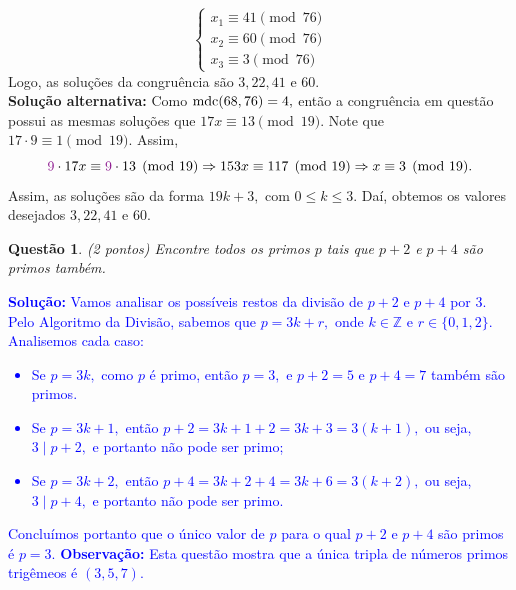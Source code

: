 \documentclass[oneside,a4paper,12pt]{article}
\newcommand{\mdc}{{\rm mdc}}
\theoremstyle{Colorido}
\theoremstyle{solu}
\theoremstyle{dotlessP}
\newcommand{\solucao}[1]{\textcolor{blue}{\textbf{Solução:} #1}}
\newtheorem{sol}{Questão}
\begin{document}
{\[\begin{cases}
x_1 \equiv41 \pmod{76}\\
x_2 \equiv 60 \pmod{76}\\
x_3 \equiv 3 \pmod{76}
\end{cases}
\]
Logo, as soluções da congruência são $3, 22, 41$ e $60.$\\\textbf{Solução alternativa:} Como $\mdc(68,76) = 4,$ então a congruência em questão possui as mesmas soluções que $17x \equiv 13 \pmod{19}.$ Note que $17 \cdot 9 \equiv 1 \pmod{19}.$ Assim,\[\textcolor{Plum}{9} \cdot 17 x \equiv \textcolor{Plum}{9} \cdot 13 \pmod{19} \Rightarrow 153x \equiv 117 \pmod{19} \Rightarrow x \equiv 3 \pmod{19}.\]Assim, as soluções são da forma $19k + 3,$ com $0 \le k \le 3.$ Daí, obtemos os valores desejados $3,22,41$ e $60.$}

\begin{sol}
\textit{(2 pontos)}
Encontre todos os primos $p$ tais que $p+2$ e $p+4$ são primos também.
\end{sol}
\solucao{
Vamos analisar os possíveis restos da divisão de $p+2$ e $p+4$ por $3.$ Pelo Algoritmo da Divisão, sabemos que $p = 3k+r,$ onde $k \in \mathbb{Z}$ e $r \in \{0,1,2 \}.$ Analisemos cada caso:
\begin{itemize}
    \item Se $p = 3k,$ como $p$ é primo, então $p = 3,$ e $p + 2 = 5$ e $p + 4 = 7$ também são primos.
    \item Se $p = 3k+1,$ então $p+2 = 3k+1+2 = 3k+3 = 3(k+1),$ ou seja, $3 \mid p+2,$ e portanto não pode ser primo;
    \item Se $p = 3k+2,$ então $p+4 = 3k+2+4 = 3k+6 = 3(k+2),$ ou seja, $3 \mid p+4,$ e portanto não pode ser primo.
\end{itemize} Concluímos portanto que o único valor de $p$ para o qual $p+2$ e $p+4$ são primos é $p = 3.$ \textbf{Observação:} Esta questão mostra que a única tripla de números primos trigêmeos é $(3,5,7).$
}
	\newpage
\end{document}
